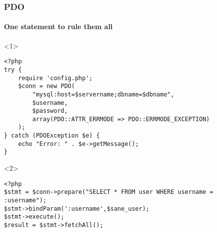 \documentclass[aspectratio=169,10pt,t]{beamer}
\begin{document}
\begin{frame}[fragile]
	\frametitle{PDO}
	\framesubtitle{One statement to rule them all}
	\begin{onlyenv}

		\begin{verbatim}
<?php
try {
	require 'config.php';
	$conn = new PDO(
		"mysql:host=$servername;dbname=$dbname",
		$username,
		$password,
		array(PDO::ATTR_ERRMODE => PDO::ERRMODE_EXCEPTION)
	);
} catch (PDOException $e) {
	echo "Error: " . $e->getMessage();
}
		\end{verbatim}
	\end{onlyenv}
	\begin{onlyenv}
		\begin{verbatim}
<?php
$stmt = $conn->prepare("SELECT * FROM user WHERE username = :username");
$stmt->bindParam(':username',$sane_user);
$stmt->execute();
$result = $stmt->fetchAll();
		\end{verbatim}
	\end{onlyenv}
\end{frame}
\end{document}
